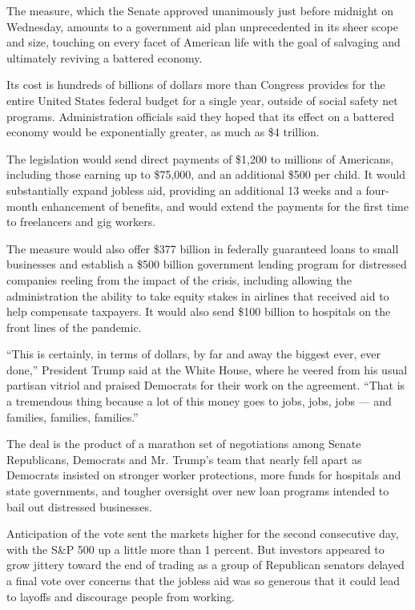 The measure, which the Senate approved unanimously just before midnight
on Wednesday, amounts to a government aid plan unprecedented in its
sheer scope and size, touching on every facet of American life with the
goal of salvaging and ultimately reviving a battered economy.

Its cost is hundreds of billions of dollars more than Congress provides
for the entire United States federal budget for a single year, outside
of social safety net programs. Administration officials said they hoped
that its effect on a battered economy would be exponentially greater, as
much as \$4 trillion.

The legislation would send direct payments of \$1,200 to millions of
Americans, including those earning up to \$75,000, and an additional
\$500 per child. It would substantially expand jobless aid, providing an
additional 13 weeks and a four-month enhancement of benefits, and would
extend the payments for the first time to freelancers and gig workers.

The measure would also offer \$377 billion in federally guaranteed loans
to small businesses and establish a \$500 billion government lending
program for distressed companies reeling from the impact of the crisis,
including allowing the administration the ability to take equity stakes
in airlines that received aid to help compensate taxpayers. It would
also send \$100 billion to hospitals on the front lines of the pandemic.

``This is certainly, in terms of dollars, by far and away the biggest
ever, ever done,'' President Trump said at the White House, where he
veered from his usual partisan vitriol and praised Democrats for their
work on the agreement. ``That is a tremendous thing because a lot of
this money goes to jobs, jobs, jobs --- and families, families,
families.''

The deal is the product of a marathon set of negotiations among Senate
Republicans, Democrats and Mr. Trump's team that nearly fell apart as
Democrats insisted on stronger worker protections, more funds for
hospitals and state governments, and tougher oversight over new loan
programs intended to bail out distressed businesses.

Anticipation of the vote sent the markets higher for the second
consecutive day, with the S\&P 500 up a little more than 1 percent. But
investors appeared to grow jittery toward the end of trading as a group
of Republican senators delayed a final vote over concerns that the
jobless aid was so generous that it could lead to layoffs and discourage
people from working.

